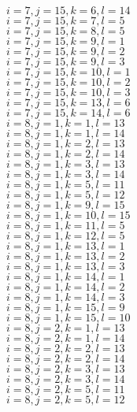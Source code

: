 \documentclass[14pt]{article}
\begin{document}
    $i=7,j=15,k=6,l=14 $ \\ 
    $i=7,j=15,k=7,l=5 $ \\ 
    $i=7,j=15,k=8,l=5 $ \\ 
    $i=7,j=15,k=9,l=1 $ \\ 
    $i=7,j=15,k=9,l=2 $ \\ 
    $i=7,j=15,k=9,l=3 $ \\ 
    $i=7,j=15,k=10,l=1 $ \\ 
    $i=7,j=15,k=10,l=2 $ \\ 
    $i=7,j=15,k=10,l=3 $ \\ 
    $i=7,j=15,k=13,l=6 $ \\ 
    $i=7,j=15,k=14,l=6 $ \\ 
    $i=8,j=1,k=1,l=13 $ \\ 
    $i=8,j=1,k=1,l=14 $ \\ 
    $i=8,j=1,k=2,l=13 $ \\ 
    $i=8,j=1,k=2,l=14 $ \\ 
    $i=8,j=1,k=3,l=13 $ \\ 
    $i=8,j=1,k=3,l=14 $ \\ 
    $i=8,j=1,k=5,l=11 $ \\ 
    $i=8,j=1,k=5,l=12 $ \\ 
    $i=8,j=1,k=9,l=15 $ \\ 
    $i=8,j=1,k=10,l=15 $ \\ 
    $i=8,j=1,k=11,l=5 $ \\ 
    $i=8,j=1,k=12,l=5 $ \\ 
    $i=8,j=1,k=13,l=1 $ \\ 
    $i=8,j=1,k=13,l=2 $ \\ 
    $i=8,j=1,k=13,l=3 $ \\ 
    $i=8,j=1,k=14,l=1 $ \\ 
    $i=8,j=1,k=14,l=2 $ \\ 
    $i=8,j=1,k=14,l=3 $ \\ 
    $i=8,j=1,k=15,l=9 $ \\ 
    $i=8,j=1,k=15,l=10 $ \\ 
    $i=8,j=2,k=1,l=13 $ \\ 
    $i=8,j=2,k=1,l=14 $ \\ 
    $i=8,j=2,k=2,l=13 $ \\ 
    $i=8,j=2,k=2,l=14 $ \\ 
    $i=8,j=2,k=3,l=13 $ \\ 
    $i=8,j=2,k=3,l=14 $ \\ 
    $i=8,j=2,k=5,l=11 $ \\ 
    $i=8,j=2,k=5,l=12 $ \\ 
\end{document}
